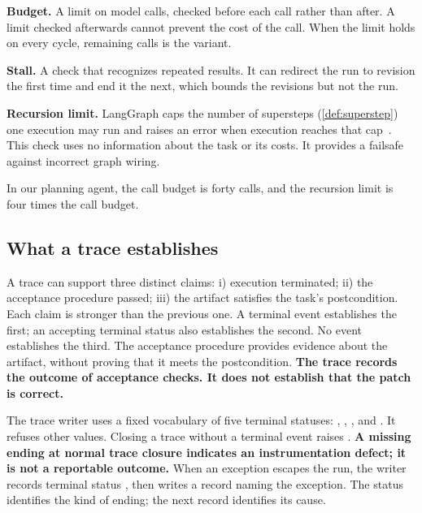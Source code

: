 \bi

\item \textbf{Budget.} A limit on model calls, checked before each call rather than after. A limit
checked afterwards cannot prevent the cost of the call. When the limit holds on every cycle,
remaining calls is the variant.

\item \textbf{Stall.} A check that recognizes repeated results. It can redirect the run to
revision the first time and end it the next, which bounds the revisions but not the run.

\item \textbf{Recursion limit.} LangGraph caps the number of supersteps (\cref{def:superstep}) one execution may run and
raises an error when execution reaches that cap~\citep{langgraph-graph-api}. This check uses no
information about the task or its costs. It provides a failsafe against incorrect graph wiring.

\ei

\noindent In our planning agent, the call budget is forty calls, and the recursion limit is four times the
call budget.

\subsection{What a trace establishes}
\label{sec:control-termination}

A trace can support three distinct claims: i) execution terminated; ii) the acceptance procedure
passed; iii) the artifact satisfies the task's postcondition. Each claim is stronger than the
previous one. A terminal event establishes the first; an accepting terminal status also establishes
the second. No event establishes the third. The acceptance procedure provides evidence about the
artifact, without proving that it meets the postcondition. \textbf{The trace records the outcome
of acceptance checks. It does not establish that the patch is correct.}

The trace writer uses a fixed vocabulary of five terminal statuses:
, , ,  and
. It refuses other values. Closing a trace without a terminal event raises
. \textbf{A missing ending at normal trace closure indicates an
instrumentation defect; it is not a reportable outcome.} When an exception escapes the run, the
writer records terminal status , then writes a record naming the exception. The
status identifies the kind of ending; the next record identifies its cause.

